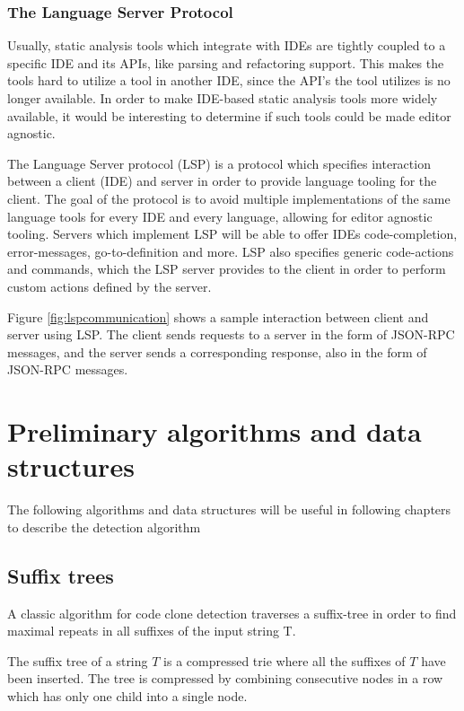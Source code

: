 \subsubsection{The Language Server Protocol}

Usually, static analysis tools which integrate with IDEs are tightly coupled to a specific
IDE and its APIs, like parsing and refactoring support. This makes the tools hard to
utilize a tool in another IDE, since the API's the tool utilizes is no longer available.
In order to make IDE-based static analysis tools more widely available, it would be
interesting to determine if such tools could be made editor agnostic.

The Language Server protocol (LSP) is a protocol which specifies interaction between a
client (IDE) and server in order to provide language tooling for the client. The goal of
the protocol is to avoid multiple implementations of the same language tools for every IDE
and every language, allowing for editor agnostic tooling. Servers which implement LSP will
be able to offer IDEs code-completion, error-messages, go-to-definition and more. LSP also
specifies generic code-actions and commands, which the LSP server provides to the client
in order to perform custom actions defined by the server.

Figure \ref{fig:lspcommunication} shows a sample interaction between client and server
using LSP. The client sends requests to a server in the form of JSON-RPC messages, and the
server sends a corresponding response, also in the form of JSON-RPC messages.

\section{Preliminary algorithms and data structures}

The following algorithms and data structures will be useful in following chapters to
describe the detection algorithm

\subsection{Suffix trees}

A classic algorithm for code clone detection traverses a suffix-tree in order to find
maximal repeats in all suffixes of the input string T.

The suffix tree of a string $T$ is a compressed trie where all the suffixes of $T$ have been
inserted. The tree is compressed by combining consecutive nodes in a row which has
only one child into a single node. 

